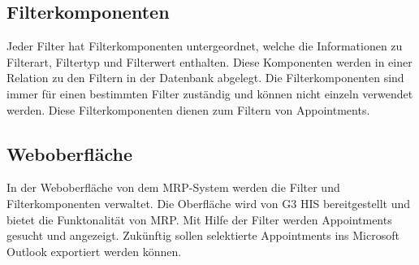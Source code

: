 \subsection{Filterkomponenten}
Jeder Filter hat Filterkomponenten untergeordnet, welche die Informationen zu Filterart, Filtertyp und Filterwert enthalten. Diese Komponenten werden in einer Relation zu den Filtern in der Datenbank abgelegt. Die Filterkomponenten sind immer für einen bestimmten Filter zuständig und können nicht einzeln verwendet werden. Diese Filterkomponenten dienen zum Filtern von Appointments.
\subsection{Weboberfläche}
In der Weboberfläche von dem MRP-System werden die Filter und Filterkomponenten verwaltet. Die Oberfläche wird von G3 HIS bereitgestellt und bietet die Funktonalität von MRP. Mit Hilfe der Filter werden Appointments gesucht und angezeigt. Zukünftig sollen selektierte Appointments ins Microsoft Outlook exportiert werden können.



 
